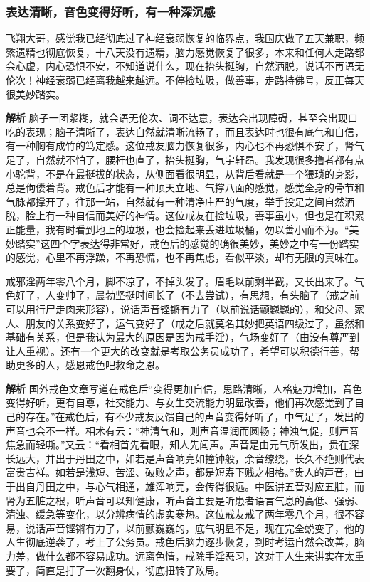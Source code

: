 \subsubsection{表达清晰，音色变得好听，有一种深沉感}

\begin{case}
    飞翔大哥，感觉我已经彻底过了神经衰弱恢复的临界点，我国庆做了五天兼职，频繁遗精也彻底恢复，十八天没有遗精，脑力感觉恢复了很多，本来和任何人走路都会心虚，内心恐惧不安，不知道说什么，现在抬头挺胸，自然洒脱，说话不再语无伦次！神经衰弱已经离我越来越远。不停捡垃圾，做善事，走路持佛号，反正每天很美妙踏实。

    \textbf{解析} 脑子一团浆糊，就会语无伦次、词不达意，表达会出现障碍，甚至会出现口吃的表现；脑子清晰了，表达自然就清晰流畅了，而且表达时也很有底气和自信，有一种胸有成竹的笃定感。这位戒友脑力恢复很多，内心也不再恐惧不安了，肾气足了，自然就不怕了，腰杆也直了，抬头挺胸，气宇轩昂。我发现很多撸者都有点小驼背，不是在最挺拔的状态，从侧面看很明显，从背后看就是一个猥琐的身影，总是佝偻着背。戒色后才能有一种顶天立地、气撑八面的感觉，感觉全身的骨节和气脉都撑开了，往那一站，自然就有一种清净庄严的气度，举手投足之间自然洒脱，脸上有一种自信而美好的神情。这位戒友在捡垃圾，善事虽小，但也是在积累正能量，我有时看到地上的垃圾，也会捡起来丢进垃圾桶，勿以善小而不为。“美妙踏实”这四个字表达得非常好，戒色后的感觉的确很美妙，美妙之中有一份踏实的感觉，心里不再浮躁，不再恐慌，也不再焦虑，看似平淡，却有无限的真味在。
\end{case}

\begin{case}
    戒邪淫两年零八个月，脚不凉了，不掉头发了。眉毛以前剩半截，又长出来了。气色好了，人变帅了，晨勃坚挺时间长了（不去尝试），有思想，有头脑了（戒之前可以用行尸走肉来形容），说话声音铿锵有力了（以前说话颤巍巍的），和父母、家人、朋友的关系变好了，运气变好了（戒之后就莫名其妙把英语四级过了，虽然和基础有关系，但是我认为最大的原因是因为戒手淫），气场变好了（由没有尊严到让人重视）。还有一个更大的改变就是考取公务员成功了，希望可以积德行善，帮助更多的人，感恩戒色吧救命之恩。

    \textbf{解析} 国外戒色文章写道在戒色后“变得更加自信，思路清晰，人格魅力增加，音色变得好听，更有自尊，社交能力、与女生交流能力明显改善，他们再次感觉到了自己的存在。”在戒色后，有不少戒友反馈自己的声音变得好听了，中气足了，发出的声音也会不一样。相术有云：“神清气和，则声音温润而圆畅；神浊气促，则声音焦急而轻嘶。”又云：“看相首先看眼，知人先闻声。声音是由元气所发出，贵在深长远大，并出于丹田之中，如若是声音响亮如撞钟般，余音缭绕，长久不绝则代表富贵吉祥。如若是浅短、苦涩、破败之声，都是短寿下贱之相格。”贵人的声音，由于出自丹田之中，与心气相通，雄浑响亮，会传得很远。中医讲五音对应五脏，而肾为五脏之根，听声音可以知健康，听声音主要是听患者语言气息的高低、强弱、清浊、缓急等变化，以分辨病情的虚实寒热。这位戒友戒了两年零八个月，很不容易，说话声音铿锵有力了，以前颤巍巍的，底气明显不足，现在完全蜕变了，他的人生彻底逆袭了，考上了公务员。戒色后脑力逐步恢复，到时考运自然会改善，脑力差，做什么都不容易成功。远离色情，戒除手淫恶习，这对于人生来讲实在太重要了，简直是打了一次翻身仗，彻底扭转了败局。
\end{case}

